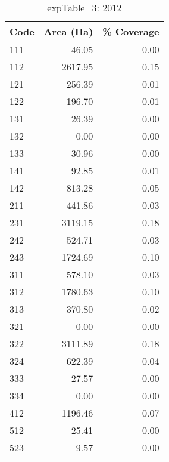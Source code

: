 \begin{table}[ht]
\centering
\begin{tabular}{lrr}
  \hline
Code & Area (Ha) & \% Coverage \\ 
  \hline
111 & 46.05 & 0.00 \\ 
  112 & 2617.95 & 0.15 \\ 
  121 & 256.39 & 0.01 \\ 
  122 & 196.70 & 0.01 \\ 
  131 & 26.39 & 0.00 \\ 
  132 & 0.00 & 0.00 \\ 
  133 & 30.96 & 0.00 \\ 
  141 & 92.85 & 0.01 \\ 
  142 & 813.28 & 0.05 \\ 
  211 & 441.86 & 0.03 \\ 
  231 & 3119.15 & 0.18 \\ 
  242 & 524.71 & 0.03 \\ 
  243 & 1724.69 & 0.10 \\ 
  311 & 578.10 & 0.03 \\ 
  312 & 1780.63 & 0.10 \\ 
  313 & 370.80 & 0.02 \\ 
  321 & 0.00 & 0.00 \\ 
  322 & 3111.89 & 0.18 \\ 
  324 & 622.39 & 0.04 \\ 
  333 & 27.57 & 0.00 \\ 
  334 & 0.00 & 0.00 \\ 
  412 & 1196.46 & 0.07 \\ 
  512 & 25.41 & 0.00 \\ 
  523 & 9.57 & 0.00 \\ 
   \hline
\end{tabular}
\caption{expTable\_3: 2012} 
\end{table}
